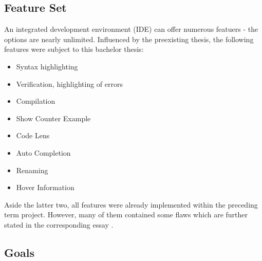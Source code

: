 \subsection{Feature Set}
An integrated development environment (IDE) can offer numerous featuers - the options are nearly unlimited. Influenced by the preexisting thesis, the following features were subject to this bachelor thesis:
\begin{itemize}
    \item Syntax highlighting
    \item Verification, highlighting of errors
    \item Compilation
    \item Show Counter Example
    \item Code Lens
    \item Auto Completion
    \item Renaming
    \item Hover Information
\end{itemize}

Aside the latter two, all features were already implemented within the preceding term project. However, many of them contained some flaws which are further stated in the corresponding essay \cite{sa}.

\subsection{Goals}
\\


